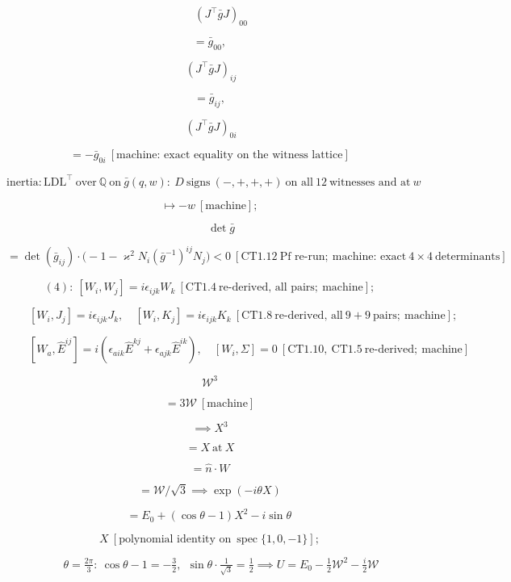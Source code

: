 \begin{theorem}
\[
\qquad (J^\top\bar g J)_{00}
\]

\[
= \bar g_{00},
\]

\[
\ (J^\top\bar g J)_{ij}
\]

\[
= \bar g_{ij},
\]

\[
\ (J^\top\bar g J)_{0i}
\]

\[
= -\bar g_{0i}\ [\text{machine: exact equality on the witness lattice}]
\]

\[
\text{inertia}: \mathrm{LDL}^\top\ \text{over}\ \mathbb Q\ \text{on}\ \bar g(q,w):\ D\ \text{signs}\ (-,+,+,+)\ \text{on all}\ 12\ \text{witnesses and at}\ w
\]

\[
\mapsto -w\ [\text{machine}];
\]

\[
\qquad \det\bar g
\]

\[
= \det(\bar g_{ij})\cdot\bigl(-1-\varkappa^2N_i(\bar g^{-1})^{ij}N_j\bigr)<0\ [\mathrm{CT1.12}\ \text{Pf re-run};\ \text{machine: exact}\ 4\times4\ \text{determinants}]
\]

\[
(4):\ [W_i,W_j]=i\epsilon_{ijk}W_k\ [\mathrm{CT1.4}\ \text{re-derived, all pairs};\ \text{machine}];
\]

\[
\qquad [W_i,J_j]=i\epsilon_{ijk}J_k,\quad[W_i,K_j]=i\epsilon_{ijk}K_k\ [\mathrm{CT1.8}\ \text{re-derived, all}\ 9{+}9\ \text{pairs};\ \text{machine}];
\]

\[
\qquad [W_a,\hat E^{ij}]=i(\epsilon_{aik}\hat E^{kj}+\epsilon_{ajk}\hat E^{ik}),\quad[W_i,\Sigma]=0\ [\mathrm{CT1.10},\ \mathrm{CT1.5}\ \text{re-derived};\ \text{machine}]
\]

\[
\mathcal W^3
\]

\[
= 3\mathcal W\ [\text{machine}]
\]

\[
\implies X^3
\]

\[
= X\ \text{at}\ X
\]

\[
= \hat n\cdot W
\]

\[
= \mathcal W/\sqrt3\implies\exp(-i\theta X)
\]

\[
= E_0+(\cos\theta-1)X^2-i\sin\theta\,
\]

\[
X\ [\text{polynomial identity on}\ \operatorname{spec}\{1,0,-1\}];
\]

\[
\qquad \theta=\tfrac{2\pi}3:\ \cos\theta-1=-\tfrac32,\ \ \sin\theta\cdot\tfrac1{\sqrt3}=\tfrac12\implies U=E_0-\tfrac12\mathcal W^2-\tfrac i2\mathcal W
\]


\end{theorem}
